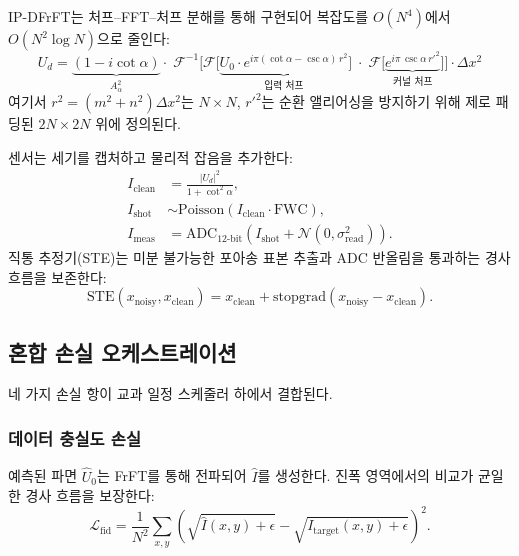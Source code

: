 \documentclass[11pt, a4paper]{article}
\theoremstyle{definition}
\theoremstyle{plain}
\newcommand{\STE}{\mathrm{STE}}
\begin{document}
IP-DFrFT는 처프--FFT--처프 분해를 통해 구현되어 복잡도를 $O(N^4)$에서 $O(N^2\log N)$으로 줄인다:
\begin{equation}
\boxed{
  U_d = \underbrace{(1 - i\cot\alpha)}_{\displaystyle A_\alpha^2}
  \cdot\;\mathcal{F}^{-1}\!\Big[
    \mathcal{F}\!\big[\underbrace{U_0 \cdot
    e^{i\pi(\cot\alpha - \csc\alpha)\,r^2}}_{\text{입력 처프}}\big]
    \;\cdot\;
    \mathcal{F}\!\big[\underbrace{e^{i\pi\,\csc\alpha\,r'^2}}_{\text{커널 처프}}\big]
  \Big] \cdot \Delta x^2
}
\label{eq:frft_full}
\end{equation}
여기서 $r^2 = (m^2+n^2)\Delta x^2$는 $N \times N$, $r'^2$는 순환 앨리어싱을 방지하기 위해 제로 패딩된 $2N \times 2N$ 위에 정의된다.

센서는 세기를 캡처하고 물리적 잡음을 추가한다:
\begin{align}
  I_{\mathrm{clean}} &= \frac{|U_d|^2}{1 + \cot^2\!\alpha},
  \label{eq:intensity}\\
  I_{\mathrm{shot}} &\sim \mathrm{Poisson}(I_{\mathrm{clean}} \cdot \mathrm{FWC}),
  \label{eq:poisson}\\
  I_{\mathrm{meas}} &= \mathrm{ADC}_{12\text{-bit}}
  (I_{\mathrm{shot}} + \mathcal{N}(0, \sigma_{\mathrm{read}}^2)).
  \label{eq:adc}
\end{align}
직통 추정기(STE)는 미분 불가능한 포아송 표본 추출과 ADC 반올림을 통과하는 경사 흐름을 보존한다:
\begin{equation}
  \STE(x_{\text{noisy}}, x_{\text{clean}}) =
  x_{\text{clean}} + \mathrm{stopgrad}(x_{\text{noisy}} - x_{\text{clean}}).
  \label{eq:ste}
\end{equation}


\subsection{혼합 손실 오케스트레이션}
\label{sec:loss}

네 가지 손실 항이 교과 일정 스케줄러 하에서 결합된다.

\subsubsection{데이터 충실도 손실}
예측된 파면 $\hat{U}_0$는 FrFT를 통해 전파되어 $\hat{I}$를 생성한다. 진폭 영역에서의 비교가 균일한 경사 흐름을 보장한다:
\begin{equation}
  \mathcal{L}_{\mathrm{fid}} = \frac{1}{N^2}\sum_{x,y}
  \left(\sqrt{\hat{I}(x,y) + \epsilon} -
  \sqrt{I_{\mathrm{target}}(x,y) + \epsilon}\right)^{\!2}.
  \label{eq:loss_fid}
\end{equation}
\end{document}
